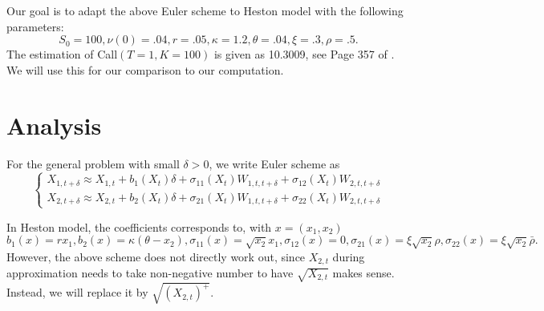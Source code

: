 \documentclass{article}
\begin{document}
Our goal is to adapt the above Euler scheme to Heston model with the following parameters:
$$ S_{0} = 100, \nu(0) = .04, r = .05, \kappa = 1.2, 
\theta = .04, \xi = .3, \rho = .5.$$
The estimation of Call$(T =1, K = 100)$ is given as 10.3009, see Page 357 of \cite{Gla04}. We will use this for our comparison to our computation.



\section{Analysis}

For the general problem with small $\delta>0$, we write Euler scheme as
$$
\left\{
\begin{array}
 {ll}
 X_{1, t+\delta} \approx X_{1, t} + b_{1}(X_{t}) \delta + \sigma_{11} (X_{t}) W_{1, t, t+\delta} + \sigma_{12}(X_{t}) W_{2, t, t+\delta} \\
 X_{2, t+\delta} \approx X_{2, t} + b_{2}(X_{t}) \delta + \sigma_{21} (X_{t}) W_{1, t, t+\delta} + \sigma_{22}(X_{t}) W_{2, t, t+\delta} 
\end{array}
\right.
$$

In Heston model, the coefficients corresponds to, with $x = (x_{1}, x_{2})$
$$b_{1}(x) = r x_{1}, b_{2}(x) = \kappa (\theta - x_{2}), 
\sigma_{11} (x)  = \sqrt{x_{2}} x_{1}, \sigma_{12}(x) = 0,
\sigma_{21}(x) = \xi \sqrt{x_{2}} \rho, \sigma_{22}(x) = \xi \sqrt{x_{2}} \bar \rho
.$$
However, the above scheme does not directly work out, since $X_{2, t}$ during approximation needs to take non-negative number to have $\sqrt{X_{2,t}}$ makes sense. Instead, we will replace it by $\sqrt{(X_{2,t})^{+}}$. 







%
%

\end{document}
